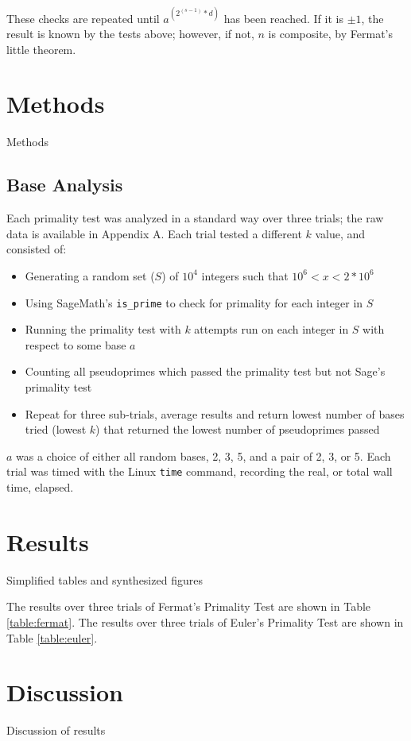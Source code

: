 \documentclass{article}
\begin{document}
These checks are repeated until $a^{(2^{(s - 1)} * d)}$ has been reached. If it is $\pm 1$, the result is known by the tests above; however, if not, $n$ is composite, by Fermat's little theorem.

\section{Methods}
Methods

\subsection{Base Analysis}
Each primality test was analyzed in a standard way over three trials; the raw data is available in Appendix A. Each trial tested a different $k$ value, and consisted of:
\begin{itemize}
    \item{Generating a random set ($S$) of $10^4$ integers such that $10^6 < x < 2*10^6$}
    \item{Using SageMath's \texttt{is\_prime} to check for primality for each integer in $S$}
    \item{Running the primality test with $k$ attempts run on each integer in $S$ with respect to some base $a$}
    \item{Counting all pseudoprimes which passed the primality test but not Sage's primality test}
    \item{Repeat for three sub-trials, average results and return lowest number of bases tried (lowest $k$) that returned the lowest number of pseudoprimes passed}
\end{itemize}
$a$ was a choice of either all random bases, 2, 3, 5, and a pair of 2, 3, or 5. Each trial was timed with the Linux \texttt{time} command, recording the real, or total wall time, elapsed. 

\section{Results}
Simplified tables and synthesized figures

The results over three trials of Fermat's Primality Test are shown in Table \ref{table:fermat}. The results over three trials of Euler's Primality Test are shown in Table \ref{table:euler}. 

\section{Discussion}
Discussion of results
\end{document}
